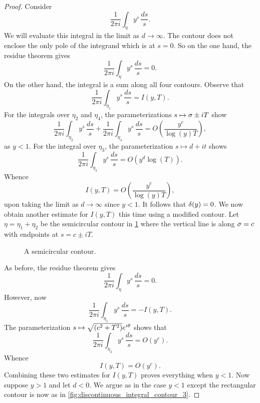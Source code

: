 \begin{proof}
      Consider
      \[
        \frac{1}{2\pi i}\int_{\eta}y^{s}\,\frac{ds}{s}.
      \]
      We will evaluate this integral in the limit as \(d \to \infty\). The contour does not enclose the only pole of the integrand which is at \(s = 0\). So on the one hand, the residue theorem gives 
      \[
        \frac{1}{2\pi i}\int_{\eta}y^{s}\,\frac{ds}{s} = 0.
      \]
      On the other hand, the integral is a sum along all four contours. Observe that
      \[
        \frac{1}{2\pi i}\int_{\eta_{1}}y^{s}\,\frac{ds}{s} = I(y,T).
      \]
      For the integrals over \(\eta_{2}\) and \(\eta_{4}\), the parameterizations \(s \mapsto \sigma\pm iT\) show
      \[
        \frac{1}{2\pi i}\int_{\eta_{2}}y^{s}\,\frac{ds}{s}+\frac{1}{2\pi i}\int_{\eta_{4}}y^{s}\,\frac{ds}{s} = O\left(\frac{y^{c}}{\log(y)T}\right),
      \]
      as \(y < 1\). For the integral over \(\eta_{3}\), the parameterization \(s \mapsto d+it\) shows
      \[
        \frac{1}{2\pi i}\int_{\eta_{3}}y^{s}\,\frac{ds}{s} = O\left(y^{d}\log(T)\right).
      \]
      Whence
      \[
        I(y,T) = O\left(\frac{y^{c}}{\log(y)T}\right),
      \]
      upon taking the limit as \(d \to \infty\) since \(y < 1\). It follows that \(\delta(y) = 0\). We now obtain another estimate for \(I(y,T)\) this time using a modified contour. Let \(\eta = \eta_{1}+\eta_{2}\) be the semicircular contour in \cref{fig:discontinuous_integral_contour_2} where the vertical line is along \(\sigma = c\) with endpoints at \(s = c\pm iT\). 

      \begin{figure}[h]
        \centering
        \caption{A semicircular contour.}
        \label{fig:discontinuous_integral_contour_2}
      \end{figure}

      As before, the residue theorem gives
      \[
        \frac{1}{2\pi i}\int_{\eta}y^{s}\,\frac{ds}{s} = 0.
      \]
      However, now
      \[
        \frac{1}{2\pi i}\int_{\eta_{1}}y^{s}\,\frac{ds}{s} = -I(y,T).
      \]
      The parameterization \(s \mapsto \sqrt{(c^{2}+T^{2})}e^{i\theta}\) shows that
      \[
        \frac{1}{2\pi i}\int_{\eta_{2}}y^{s}\,\frac{ds}{s} = O(y^{c}).
      \]
      Whence
      \[
        I(y,T) = O(y^{c}).
      \]
      Combining these two estimates for \(I(y,T)\) proves everything when \(y < 1\). Now suppose \(y > 1\) and let \(d < 0\). We argue as in the case \(y < 1\) except the rectangular contour is now as in \cref{fig:discontinuous_integral_contour_3}.


\end{proof}
